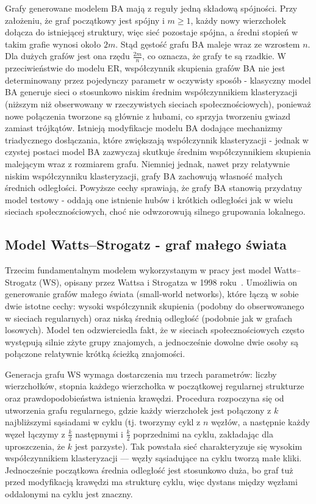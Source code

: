 Grafy generowane modelem BA mają z reguły jedną składową spójności. Przy założeniu, że graf początkowy jest spójny i $m \ge 1$, każdy nowy wierzchołek dołącza do istniejącej struktury, więc sieć pozostaje spójna, a średni stopień w takim grafie wynosi około $2m$. Stąd gęstość grafu BA maleje wraz ze wzrostem $n$. Dla dużych grafów jest ona rzędu $\frac{2m}{n}$, co oznacza, że grafy te są rzadkie. W przeciwieństwie do modelu ER, współczynnik skupienia grafów BA nie jest determinowany przez pojedynczy parametr w oczywisty sposób - klasyczny model BA generuje sieci o stosunkowo niskim średnim współczynnikiem klasteryzacji (niższym niż obserwowany w rzeczywistych sieciach społecznościowych), ponieważ nowe połączenia tworzone są głównie z hubami, co sprzyja tworzeniu gwiazd zamiast trójkątów. Istnieją modyfikacje modelu BA dodające mechanizmy triadycznego dosłączania, które zwiększają współczynnik klasteryzacji - jednak w czystej postaci model BA zazwyczaj skutkuje średnim współczynnikiem skupienia malejącym wraz z rozmiarem grafu. Niemniej jednak, nawet przy relatywnie niskim współczynniku klasteryzacji, grafy BA zachowują własność małych średnich odległości. Powyższe cechy sprawiają, że grafy BA stanowią przydatny model testowy - oddają one istnienie hubów i krótkich odległości jak w wielu sieciach społecznościowych, choć nie odwzorowują silnego grupowania lokalnego.

\subsection{Model Watts--Strogatz - graf małego świata}
Trzecim fundamentalnym modelem wykorzystanym w pracy jest model Watts--Strogatz (WS), opisany przez Wattsa i Strogatza w 1998 roku~\cite{Watts1998}. Umożliwia on generowanie grafów małego świata (small-world networks), które łączą w sobie dwie istotne cechy: wysoki współczynnik skupienia (podobny do obserwowanego w sieciach regularnych) oraz niską średnią odległość (podobnie jak w grafach losowych). Model ten odzwierciedla fakt, że w sieciach społecznościowych często występują silnie zżyte grupy znajomych, a jednocześnie dowolne dwie osoby są połączone relatywnie krótką ścieżką znajomości.

Generacja grafu WS wymaga dostarczenia mu trzech parametrów: liczby wierzchołków, stopnia każdego wierzchołka w początkowej regularnej strukturze oraz prawdopodobieństwa istnienia krawędzi. Procedura rozpoczyna się od utworzenia grafu regularnego, gdzie każdy wierzchołek jest połączony z $k$ najbliższymi sąsiadami w cyklu (tj. tworzymy cykl z $n$ węzłów, a następnie każdy węzeł łączymy z $\frac{k}{2}$ następnymi i $\frac{k}{2}$ poprzednimi na cyklu, zakładając dla uproszczenia, że $k$ jest parzyste). Tak powstała sieć charakteryzuje się wysokim współczynnikiem klasteryzacji — węzły sąsiadujące na cyklu tworzą małe kliki.
Jednocześnie początkowa średnia odległość jest stosunkowo duża, bo graf tuż przed modyfikacją krawędzi ma strukturę cyklu, więc dystans między węzłami oddalonymi na cyklu jest znaczny.

